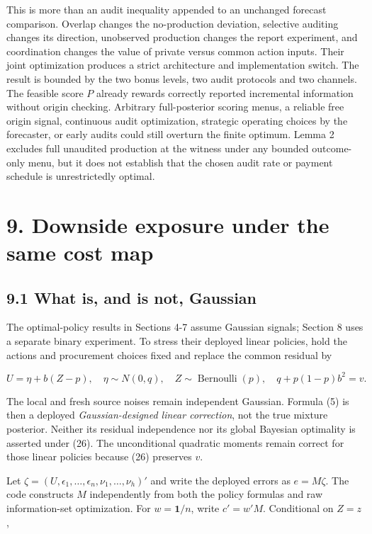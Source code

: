 \documentclass[
  11pt,
]{article}
\begin{document}
This is more than an audit inequality appended to an unchanged forecast
comparison. Overlap changes the no-production deviation, selective
auditing changes its direction, unobserved production changes the report
experiment, and coordination changes the value of private versus common
action inputs. Their joint optimization produces a strict architecture
and implementation switch. The result is bounded by the two bonus
levels, two audit protocols and two channels. The feasible score \(P\)
already rewards correctly reported incremental information without
origin checking. Arbitrary full-posterior scoring menus, a reliable free
origin signal, continuous audit optimization, strategic operating
choices by the forecaster, or early audits could still overturn the
finite optimum. Lemma 2 excludes full unaudited production at the
witness under any bounded outcome-only menu, but it does not establish
that the chosen audit rate or payment schedule is unrestrictedly
optimal.

\section{9. Downside exposure under the same cost
map}\label{downside-exposure-under-the-same-cost-map}

\subsection{9.1 What is, and is not,
Gaussian}\label{what-is-and-is-not-gaussian}

The optimal-policy results in Sections 4-7 assume Gaussian signals;
Section 8 uses a separate binary experiment. To stress their deployed
linear policies, hold the actions and procurement choices fixed and
replace the common residual by

\[U=\eta+b(Z-p),\quad \eta\sim N(0,q),\quad
Z\sim\operatorname{Bernoulli}(p),\quad q+p(1-p)b^2=v. \tag{26}\]

The local and fresh source noises remain independent Gaussian. Formula
(5) is then a deployed \emph{Gaussian-designed linear correction}, not
the true mixture posterior. Neither its residual independence nor its
global Bayesian optimality is asserted under (26). The unconditional
quadratic moments remain correct for those linear policies because (26)
preserves \(v\).

Let \(\zeta=(U,\epsilon_1,\ldots,\epsilon_n,\nu_1,\ldots,\nu_h)'\) and
write the deployed errors as \(e=M\zeta\). The code constructs \(M\)
independently from both the policy formulas and raw information-set
optimization. For \(w=\mathbf1/n\), write \(c'=w'M\). Conditional on
\(Z=z\),
\end{document}
